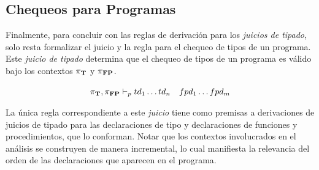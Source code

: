 \subsection{Chequeos para Programas}

Finalmente, para concluir con las reglas de derivación para los \textit{juicios de tipado}, solo resta formalizar el juicio y la regla para el chequeo de tipos de un programa. Este \textit{juicio de tipado} determina que el chequeo de tipos de un programa es válido bajo los contextos $\pi_{\mathbf{T}}$ y $\pi_{\mathbf{FP}}$.



\begin{gather*}
\PI{T}, \PI{FP} \DASH{p} td_{1} \ldots td_{n} \quad fpd_{1} \ldots fpd_{m}
\end{gather*}

La única regla correspondiente a este \textit{juicio} tiene como premisas a derivaciones de juicios de tipado para las declaraciones de tipo y declaraciones de funciones y procedimientos, que lo conforman.
Notar que los contextos involucrados en el análisis se construyen de manera incremental, lo cual manifiesta la relevancia del orden de las declaraciones que aparecen en el programa.

